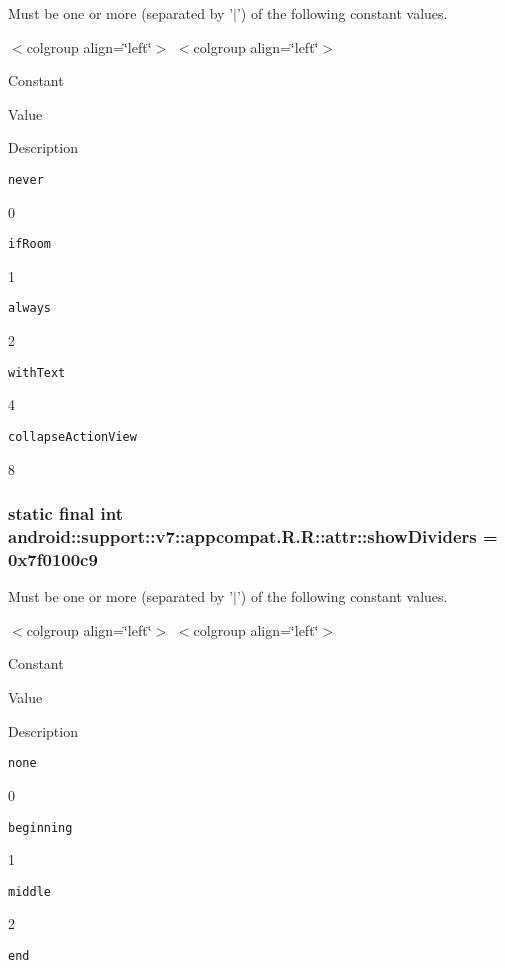 Must be one or more (separated by '$|$') of the following constant values. \begin{TabularC}{0}
\hline
\end{TabularC}
$<$colgroup align=\char`\"{}left\char`\"{}$>$ $<$colgroup align=\char`\"{}left\char`\"{}$>$ 

Constant

Value

Description 

{\tt never}

0

{\tt ifRoom}

1

{\tt always}

2

{\tt withText}

4

{\tt collapseActionView}

8\hypertarget{classandroid_1_1support_1_1v7_1_1appcompat_1_1_r_1_1attr_07982cb418d5bcf47bb5691b0e6f2a45}{
\subsubsection[{showDividers}]{\setlength{\rightskip}{0pt plus 5cm}static final int android::support::v7::appcompat.R.R::attr::showDividers = 0x7f0100c9}}
\label{classandroid_1_1support_1_1v7_1_1appcompat_1_1_r_1_1attr_07982cb418d5bcf47bb5691b0e6f2a45}


Must be one or more (separated by '$|$') of the following constant values. \begin{TabularC}{0}
\hline
\end{TabularC}
$<$colgroup align=\char`\"{}left\char`\"{}$>$ $<$colgroup align=\char`\"{}left\char`\"{}$>$ 

Constant

Value

Description 

{\tt none}

0

{\tt beginning}

1

{\tt middle}

2

{\tt end}

